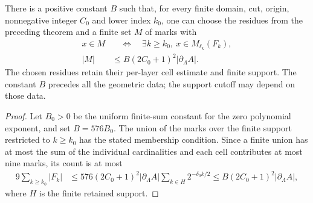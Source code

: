 \begin{lemma}
    \label{thm:area_law_uniform_initial_mark_count}
    \leanok
    There is a positive constant $B$ such that, for every finite domain,
    cut, origin, nonnegative integer $C_0$ and lower index $k_0$, one can
    choose the residues from the preceding theorem and a finite set $M$
    of marks with
    \begin{align}
        x\in M
            & \quad\Longleftrightarrow\quad
        \exists k\ge k_0,\ x\in M_{\ell_k}(F_k),   \\
        |M| & \le B(2C_0+1)^2|\partial_\Lambda A|.
    \end{align}
    The chosen residues retain their per-layer cell estimate and finite
    support. The constant $B$ precedes all the geometric data; the
    support cutoff may depend on those data.
\end{lemma}
\begin{proof}\leanok
    Let $B_0>0$ be the uniform finite-sum constant for the zero polynomial
    exponent, and set $B=576B_0$. The union of the marks
    over the finite support restricted to $k\ge k_0$ has the stated
    membership condition. Since a finite union has at most the sum of
    the individual cardinalities and each cell contributes at most
    nine marks, its count is at most
    \begin{align}
        9\sum_{k\ge k_0}|F_k|
         & \le576(2C_0+1)^2|\partial_\Lambda A|
        \sum_{k\in H}2^{-\delta_0 k/2}
        \le B(2C_0+1)^2|\partial_\Lambda A|,
    \end{align}
    where $H$ is the finite retained support.
\end{proof}


